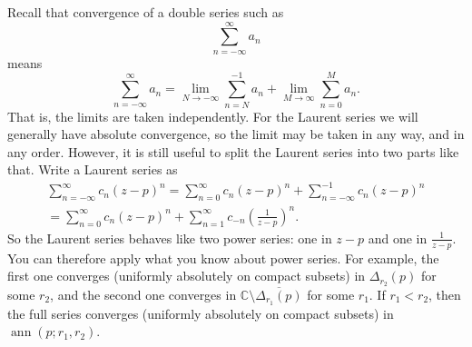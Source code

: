 \documentclass[12pt,openany]{book}
\newcommand{\ann}{\operatorname{ann}}
\newcommand{\C}{{\mathbb{C}}}
\theoremstyle{plain}
\theoremstyle{remark}
\theoremstyle{definition}
\theoremstyle{exercise}
\theoremstyle{example}
\begin{document}
Recall that convergence of a double series such as
\begin{equation*}
\sum_{n=-\infty}^{\infty} a_n
\end{equation*}
means
\begin{equation*}
\sum_{n=-\infty}^{\infty} a_n
=
\lim_{N\to -\infty}
\sum_{n=N}^{-1} a_n
+
\lim_{M\to \infty}
\sum_{n=0}^{M} a_n .
\end{equation*}
That is, the limits are taken independently.  For the Laurent series we
will generally have
absolute convergence, so the limit may be taken in any way,
and in any order.
However, it is still useful to split the Laurent series into two
parts like that.
Write a Laurent series as 
\begin{multline*}
\sum_{n=-\infty}^{\infty} c_n {(z-p)}^n
=
\sum_{n=0}^{\infty} c_n {(z-p)}^n
+
\sum_{n=-\infty}^{-1} c_n {(z-p)}^n
\\
=
\sum_{n=0}^{\infty} c_n {(z-p)}^n
+
\sum_{n=1}^{\infty} c_{-n} {\left(\frac{1}{z-p}\right)}^n .
\end{multline*}
So the Laurent series behaves like two power series: one in $z-p$ and one
in $\frac{1}{z-p}$.  You can therefore apply what you know about power
series.  For example, the first one converges (uniformly absolutely on compact subsets) in $\Delta_{r_2}(p)$
for some $r_2$,
and the second one converges in $\C \setminus \overline{\Delta_{r_1}(p)}$
for some $r_1$.
If $r_1 < r_2$, then the full series converges
(uniformly absolutely on compact subsets)
in $\ann(p;r_1,r_2)$.
\end{document}
